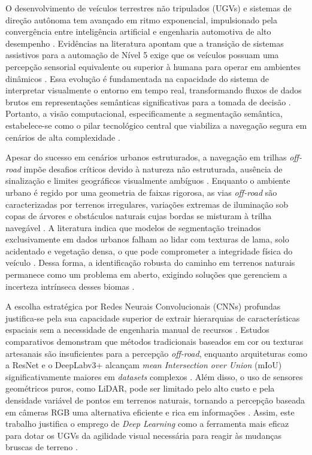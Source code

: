 \documentclass[a4paper,10pt, twocolumn]{article}
\begin{document}
O desenvolvimento de veículos terrestres não tripulados (UGVs) e sistemas de direção autônoma tem avançado em ritmo 
exponencial, impulsionado pela convergência entre inteligência artificial e engenharia automotiva de 
alto desempenho \cite{10.1145/3729420, KABIR2025102644}. Evidências na 
literatura apontam que a transição de sistemas assistivos para a automação de Nível 5 
exige que os veículos possuam uma percepção sensorial equivalente ou superior à humana 
para operar em ambientes dinâmicos \cite{10.1145/3729420, LATEEF2019321}. Essa evolução é fundamentada 
na capacidade do sistema de interpretar visualmente o entorno em tempo real, transformando 
fluxos de dados brutos em representações semânticas significativas para a tomada de 
decisão \cite{LATEEF2019321, GARCIAGARCIA201841}. Portanto, a visão computacional, 
especificamente a segmentação semântica, estabelece-se como o pilar tecnológico 
central que viabiliza a navegação segura em cenários de alta complexidade \cite{KABIR2025102644, GARCIAGARCIA201841}.

Apesar do sucesso em cenários urbanos estruturados, a navegação em trilhas 
\textit{off-road} impõe desafios críticos devido à natureza não estruturada, 
ausência de sinalização e limites geográficos visualmente ambíguos \cite{KABIR2025102644, Maturana2017, 9551643}. Enquanto o 
ambiente urbano é regido por uma geometria de faixas rigorosa, as vias \textit{off-road} são caracterizadas 
por terrenos irregulares, variações extremas de iluminação sob copas de árvores e obstáculos naturais 
cujas bordas se misturam à trilha navegável \cite{s26061944, KABIR2025102644, s19112577}. A literatura indica 
que modelos de segmentação treinados exclusivamente em dados urbanos falham ao lidar com texturas de lama, solo 
acidentado e vegetação densa, o que pode comprometer a integridade física do veículo \cite{KABIR2025102644, 10742323}. Dessa forma, a 
identificação robusta do caminho em terrenos naturais permanece como um problema em aberto, exigindo soluções 
que gerenciem a incerteza intrínseca desses biomas \cite{KABIR2025102644, 9551643}.

A escolha estratégica por Redes Neurais Convolucionais (CNNs) profundas 
justifica-se pela sua capacidade superior de extrair hierarquias de características 
espaciais sem a necessidade de engenharia manual de recursos \cite{LATEEF2019321, GARCIAGARCIA201841, 10.1145/3729420}. Estudos 
comparativos demonstram que métodos tradicionais baseados em cor ou texturas artesanais são insuficientes 
para a percepção \textit{off-road}, enquanto arquiteturas como a ResNet e o DeepLabv3+ 
alcançam \textit{mean Intersection over Union} (mIoU) significativamente maiores em \textit{datasets} 
complexos \cite{BEYCIMEN2026113680, Sgibnev2020, LATEEF2019321}. Além disso, o uso de sensores geométricos puros, 
como LiDAR, pode ser limitado pelo alto custo e pela densidade variável de pontos em terrenos naturais, 
tornando a percepção baseada em câmeras RGB uma alternativa eficiente e rica em 
informações \cite{KABIR2025102644, BEYCIMEN2026113680, Maturana2017}. Assim, este trabalho 
justifica o emprego de \textit{Deep Learning} como a ferramenta mais eficaz para 
dotar os UGVs da agilidade visual necessária para reagir às mudanças bruscas de terreno \cite{10.1145/3729420, BEYCIMEN2026113680}.
\end{document}
